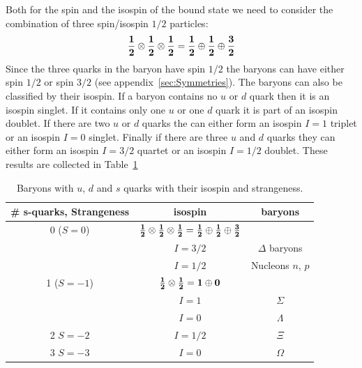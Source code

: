 \documentclass[12pt]{article}
\begin{document}
Both for the spin and the isospin of the bound state we need to consider the combination of three spin/isospin $1/2$ particles: \[{\bf \frac{1}{2}}\otimes{\bf \frac{1}{2}}\otimes{\bf \frac{1}{2}}
=
{\bf \frac{1}{2}}\oplus{\bf \frac{1}{2}}\oplus{\bf \frac{3}{2}}\]
Since the three quarks in the baryon have spin $1/2$ the baryons can have either spin $1/2$ or spin $3/2$ (see appendix~\ref{sec:Symmetries}). The baryons can also be classified by their isospin. If a baryon contains no $u$ or $d$ quark then it is an isospin singlet. If it contains only one $u$ or one $d$ quark it is part of an isospin doublet. If there are two $u$ or $d$ quarks the can either form an isospin $I=1$ triplet or an isospin $I=0$ singlet. Finally if there are three $u$ and $d$ quarks they can either form an isospin $I=3/2$ quartet or an isospin $I=1/2$ doublet. These results are collected in Table~\ref{tbl:baryons}
\begin{table}
\begin{center}
\begin{tabular}{|c|c|c|}
\hline
\# s-quarks, Strangeness  & isospin  &  baryons \\\hline
0 ($S=0$)  & ${\bf \frac{1}{2}}\otimes{\bf \frac{1}{2}}\otimes{\bf \frac{1}{2}}
=
{\bf \frac{1}{2}}\oplus{\bf \frac{1}{2}}\oplus{\bf \frac{3}{2}}$   & \\
  & $I=3/2$   & $\Delta$ baryons \\
    & $I=1/2$   & Nucleons $n$, $p$\\\hline
1 ($S=-1$)  & ${\bf \frac{1}{2}}\otimes{\bf \frac{1}{2}}
=
{\bf 1}\oplus{\bf 0 }$  & \\
& $I=1$ &  $\Sigma$\\
& $I=0$ &  $\Lambda$\\\hline
2 $S=-2$ & $I=1/2$ & $\Xi$ \\\hline
3 $S=-3$ & $I=0$ & $\Omega$\\\hline
\end{tabular}
\end{center}\caption{Baryons with $u$, $d$ and $s$ quarks with their isospin and strangeness.}\label{tbl:baryons}
\end{table}  
\end{document}
